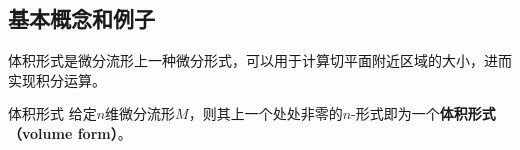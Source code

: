 





\subsection{基本概念和例子}


体积形式是微分流形上一种微分形式，可以用于计算切平面附近区域的大小，进而实现积分运算。

\begin{definition}{体积形式}
给定$n$维微分流形$M$，则其上一个处处非零的$n$-形式即为一个\textbf{体积形式（volume form）}。
\end{definition}

